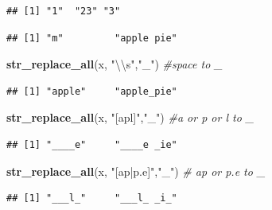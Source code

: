 \documentclass[]{book}
\newenvironment{Shaded}{\begin{snugshade}}{\end{snugshade}}
\newcommand{\KeywordTok}[1]{\textcolor[rgb]{0.13,0.29,0.53}{\textbf{#1}}}
\newcommand{\CharTok}[1]{\textcolor[rgb]{0.31,0.60,0.02}{#1}}
\newcommand{\StringTok}[1]{\textcolor[rgb]{0.31,0.60,0.02}{#1}}
\newcommand{\CommentTok}[1]{\textcolor[rgb]{0.56,0.35,0.01}{\textit{#1}}}
\newcommand{\NormalTok}[1]{#1}
\begin{document}
\begin{verbatim}
## [1] "1"  "23" "3"
\end{verbatim}

\begin{Shaded}
\end{Shaded}

\begin{verbatim}
## [1] "m"         "apple pie"
\end{verbatim}

\begin{Shaded}
\begin{Highlighting}[]
\KeywordTok{str_replace_all}\NormalTok{(x, }\StringTok{"}\CharTok{\textbackslash{}\textbackslash{}}\StringTok{s"}\NormalTok{,}\StringTok{"_"}\NormalTok{) }\CommentTok{#space to _}
\end{Highlighting}
\end{Shaded}

\begin{verbatim}
## [1] "apple"     "apple_pie"
\end{verbatim}

\begin{Shaded}
\begin{Highlighting}[]
\KeywordTok{str_replace_all}\NormalTok{(x, }\StringTok{"[apl]"}\NormalTok{,}\StringTok{"_"}\NormalTok{) }\CommentTok{#a or p or l to _}
\end{Highlighting}
\end{Shaded}

\begin{verbatim}
## [1] "____e"     "____e _ie"
\end{verbatim}

\begin{Shaded}
\begin{Highlighting}[]
\KeywordTok{str_replace_all}\NormalTok{(x, }\StringTok{"[ap|p.e]"}\NormalTok{,}\StringTok{"_"}\NormalTok{) }\CommentTok{# ap or p.e to _}
\end{Highlighting}
\end{Shaded}

\begin{verbatim}
## [1] "___l_"     "___l_ _i_"
\end{verbatim}
\end{document}
